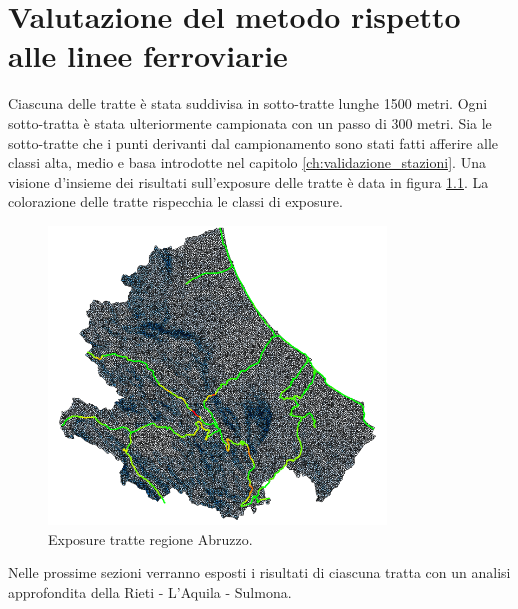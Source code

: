 
\chapter{Valutazione del metodo rispetto alle linee ferroviarie} 
Ciascuna delle tratte è stata suddivisa in sotto-tratte lunghe 1500 metri. Ogni sotto-tratta è stata ulteriormente campionata con un passo di 300 metri. Sia le sotto-tratte che i punti derivanti dal campionamento sono stati fatti afferire alle classi alta, medio e basa introdotte nel capitolo \ref{ch:validazione_stazioni}.
Una visione d'insieme dei risultati sull'exposure delle tratte è data in figura \ref{tratte_exposure}. La colorazione delle tratte rispecchia le classi di exposure. 

\begin{figure}[h]
	\centering
	\includegraphics[width=0.8\textwidth]{images/completo}
	\caption{Exposure tratte regione Abruzzo.}
	\label{tratte_exposure}
\end{figure}

Nelle prossime sezioni verranno esposti i risultati di ciascuna tratta con un analisi approfondita della Rieti - L'Aquila - Sulmona.

